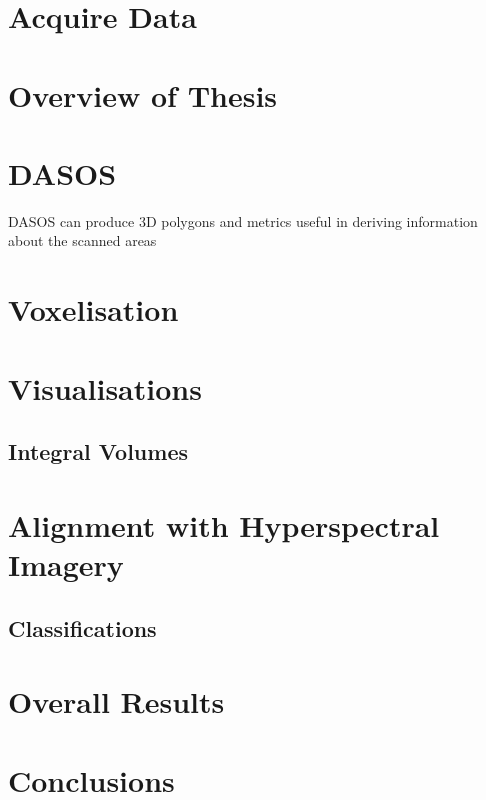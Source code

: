 \documentclass[11pt,nofootinbib]{report}
\begin{document}
    \chapter{Acquire Data}\label{AcquireData}
	    
	    \newpage
	\chapter{Overview of Thesis}\label{PipeLine}
		
	\chapter{DASOS}\label{DASOS}
			
		DASOS can produce 3D polygons and metrics useful in deriving information about the scanned areas
		
	\chapter{Voxelisation}\label{Voxelisation}
	    
	    \newpage

		 		
	\chapter{Visualisations}\label{Visualisations}
		
		\newpage
		\section{Integral Volumes}\label{Rep_IntegralVolumes}
			 
			 \newpage
	\chapter{Alignment with Hyperspectral Imagery}\label{Alignment}
		
		\newpage		
		\section{Classifications}\label{Classifications}
			
			\newpage
	\chapter{Overall Results}\label{Results}
		
		\newpage
	\chapter{Conclusions}\label{Conclusions}
		
		\newpage
\end{document}
